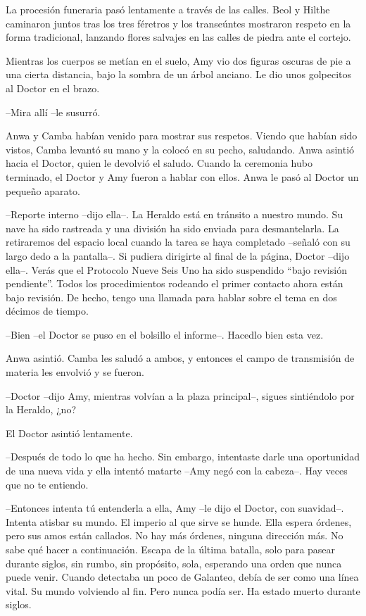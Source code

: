 {La procesión funeraria pasó lentamente a través de las calles. Beol y
	Hilthe caminaron juntos tras los tres féretros y los transeúntes
	mostraron respeto en la forma tradicional, lanzando flores salvajes en
las calles de piedra ante el cortejo.}

{Mientras los cuerpos se metían en el suelo, Amy vio dos figuras oscuras
	de pie a una cierta distancia, bajo la sombra de un árbol anciano. Le
dio unos golpecitos al Doctor en el brazo.}

{--Mira allí --le susurró.}

{Anwa y Camba habían venido para mostrar sus respetos. Viendo que habían
	sido vistos, Camba levantó su mano y la colocó en su pecho, saludando.
	Anwa asintió hacia el Doctor, quien le devolvió el saludo. Cuando la
	ceremonia hubo terminado, el Doctor y Amy fueron a hablar con ellos.
Anwa le pasó al Doctor un pequeño aparato.}

{--Reporte interno --dijo ella--. La Heraldo está en tránsito a
	nuestro mundo. Su nave ha sido rastreada y una división ha sido enviada
	para desmantelarla. La retiraremos del espacio local cuando la tarea se
	haya completado --señaló con su largo dedo a la pantalla--. Si pudiera
	dirigirte al final de la página, Doctor --dijo ella--. Verás que el
	Protocolo Nueve Seis Uno ha sido suspendido ``bajo revisión pendiente''.
	Todos los procedimientos rodeando el primer contacto ahora están bajo
	revisión. De hecho, tengo una llamada para hablar sobre el tema en dos
décimos de tiempo.}

{--Bien --el Doctor se puso en el bolsillo el informe--. Hacedlo bien
esta vez.}

{Anwa asintió. Camba les saludó a ambos, y entonces el campo de
transmisión de materia les envolvió y se fueron.}

{--Doctor --dijo Amy, mientras volvían a la plaza principal--, sigues
sintiéndolo por la Heraldo, ¿no?}

{El Doctor asintió lentamente.}

{--Después de todo lo que ha hecho. Sin embargo, intentaste darle una
	oportunidad de una nueva vida y ella intentó matarte --Amy negó con la
cabeza--. Hay veces que no te entiendo.}

{--Entonces intenta tú entenderla a ella, Amy --le dijo el Doctor, con
	suavidad--. Intenta atisbar su mundo. El imperio al que sirve se hunde.
	Ella espera órdenes, pero sus amos están callados. No hay más órdenes,
	ninguna dirección más. No sabe qué hacer a continuación. Escapa de la
	última batalla, solo para pasear durante siglos, sin rumbo, sin
	propósito, sola, esperando una orden que nunca puede venir. Cuando
	detectaba un poco de Galanteo, debía de ser como una línea vital. Su
	mundo volviendo al fin. Pero nunca podía ser. Ha estado muerto durante
siglos.}


